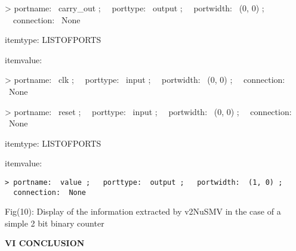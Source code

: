 \documentclass[a4paper]{article}
\begin{document}
\begin{center}
\begin{minipage}{6.04167in}
{\ttfamily\color[rgb]{0.0,0.0,0.039215688}
{\textgreater} portname: \ carry\_out ; \ \ porttype: \ output ;
\ \ portwidth: \ (0, 0) ; \ \ connection: \ None}


\bigskip

{\ttfamily\color[rgb]{0.0,0.0,0.039215688}
itemtype: LISTOFPORTS}

{\ttfamily\color[rgb]{0.0,0.0,0.039215688}
itemvalue:}

{\ttfamily\color[rgb]{0.0,0.0,0.039215688}
{\textgreater} portname: \ clk ; \ \ porttype: \ input ; \ \ portwidth:
\ (0, 0) ; \ \ connection: \ None}

{\ttfamily\color[rgb]{0.0,0.0,0.039215688}
{\textgreater} portname: \ reset ; \ \ porttype: \ input ;
\ \ portwidth: \ (0, 0) ; \ \ connection: \ None}


\bigskip

{\ttfamily\color[rgb]{0.0,0.0,0.039215688}
itemtype: LISTOFPORTS}

{\ttfamily\color[rgb]{0.0,0.0,0.039215688}
itemvalue:}

{\color[rgb]{0.0,0.0,0.039215688}
\texttt{{\textgreater} portname: \ value ; \ \ porttype: \ output ;
\ \ portwidth: \ (1, 0) ; \ \ connection: \ None}}
\end{minipage}
\end{center}

\bigskip


\bigskip


\bigskip


\bigskip


\bigskip


\bigskip


\bigskip


\bigskip


\bigskip


\bigskip


\bigskip


\bigskip


\bigskip


\bigskip


\bigskip

{\centering\rmfamily\color[rgb]{0.0,0.0,0.039215688}
Fig(10): Display of the information extracted by v2NuSMV in the case of
a simple 2 bit binary counter
\par}


\bigskip


\bigskip


\bigskip

{\color[rgb]{0.0,0.0,0.039215688}
\textrm{\textbf{VI CONCLUSION}}}
\end{document}
